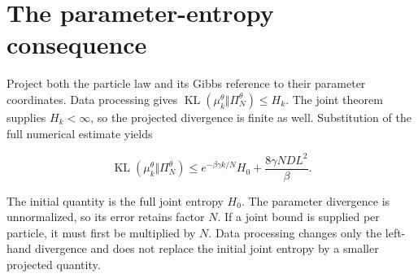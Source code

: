\documentclass[11pt,a4paper]{article}
\begin{document}
\section{\texorpdfstring{The parameter-entropy consequence}{The parameter-entropy consequence}}


Project both the particle law and its Gibbs reference to their parameter coordinates. Data processing gives \(\operatorname{KL}(\mu_k^\theta\Vert\Pi_N^\theta)\le H_k\). The joint theorem supplies \(H_k<\infty\), so the projected divergence is finite as well. Substitution of the full numerical estimate yields

\[\operatorname{KL}(\mu_k^\theta\Vert\Pi_N^\theta)\le e^{-\beta\gamma k/N}H_0+\frac{8\gamma ND L^2}{\beta}.\]

The initial quantity is the full joint entropy \(H_0\). The parameter divergence is unnormalized, so its error retains factor \(N\). If a joint bound is supplied per particle, it must first be multiplied by \(N\). Data processing changes only the left-hand divergence and does not replace the initial joint entropy by a smaller projected quantity.
\end{document}
